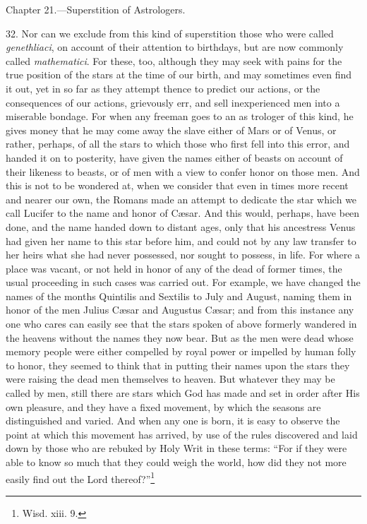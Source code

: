 Chapter 21.—Superstition of Astrologers.

32. Nor can we exclude from this kind of superstition those who were called \emph{genethliaci}, on account of their attention to birthdays, but are now commonly called \emph{mathematici}. For these, too, although they may seek with pains for the true position of the stars at the time of our birth, and may sometimes even find it out, yet in so far as they attempt thence to predict our actions, or the consequences of our actions, grievously err, and sell inexperienced men into a miserable bondage. For when any freeman goes to an as  trologer of this kind, he gives money that he may come away the slave either of Mars or of Venus, or rather, perhaps, of all the stars to which those who first fell into this error, and handed it on to posterity, have given the names either of beasts on account of their likeness to beasts, or of men with a view to confer honor on those men. And this is not to be wondered at, when we consider that even in times more recent and nearer our own, the Romans made an attempt to dedicate the star which we call Lucifer to the name and honor of Cæsar. And this would, perhaps, have been done, and the name handed down to distant ages, only that his ancestress Venus had given her name to this star before him, and could not by any law transfer to her heirs what she had never possessed, nor sought to possess, in life. For where a place was vacant, or not held in honor of any of the dead of former times, the usual proceeding in such cases was carried out. For example, we have changed the names of the months Quintilis and Sextilis to July and August, naming them in honor of the men Julius Cæsar and Augustus Cæsar; and from this instance any one who cares can easily see that the stars spoken of above formerly wandered in the heavens without the names they now bear. But as the men were dead whose memory people were either compelled by royal power or impelled by human folly to honor, they seemed to think that in putting their names upon the stars they were raising the dead men themselves to heaven. But whatever they may be called by men, still there are stars which God has made and set in order after His own pleasure, and they have a fixed movement, by which the seasons are distinguished and varied. And when any one is born, it is easy to observe the point at which this movement has arrived, by use of the rules discovered and laid down by those who are rebuked by Holy Writ in these terms: “For if they were able to know so much that they could weigh the world, how did they not more easily find out the Lord thereof?”\footnote{Wisd. xiii. 9.}

